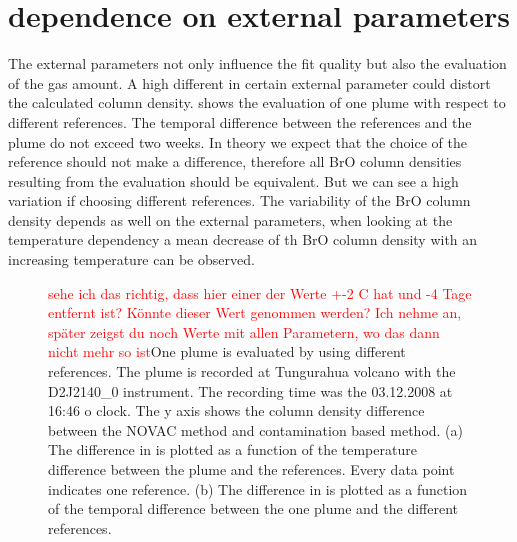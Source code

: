 \documentclass  [
  paper    = a4,
  BCOR     = 10mm,
  twoside,
  fontsize = 12pt,
  fleqn,
  toc      = bibnumbered,
  toc      = listofnumbered,
  numbers  = noendperiod,
  headings = normal,
  listof   = leveldown,
  version  = 3.03
]                                       {scrreprt}
\begin{document}
	\section{  dependence on external parameters\label{Chap:BrOdep}}
	The external parameters not only influence the fit quality but also the evaluation of the gas amount. A high different in certain external parameter could distort the calculated   column density.  shows the evaluation of one plume with respect to different references. The temporal difference between the references and the plume do not exceed two weeks. In theory we expect that the choice of  the reference should not make a difference, therefore all BrO column densities resulting from the evaluation should be equivalent. But we can see a high variation if choosing different references. The variability of the BrO column density depends as well on the external parameters, when looking at the temperature dependency a mean decrease of th BrO column density with an increasing temperature can be observed.
		\begin{figure}
		\caption{\textcolor{red}{sehe ich das richtig, dass hier einer der Werte +-2 C hat und -4 Tage entfernt ist? Könnte dieser Wert genommen werden? Ich nehme an, später zeigst du noch Werte mit allen Parametern, wo das dann nicht mehr so ist}One plume is evaluated by using different references. The plume is recorded at Tungurahua volcano with the D2J2140\_0 instrument. The recording time was the  03.12.2008  at 16:46 o clock. The y axis shows the   column density difference between the NOVAC method and contamination based method. (a) The difference in   is plotted as a function of the temperature difference between the plume and the references. Every data point indicates one reference. (b) The difference in   is plotted as a function of the temporal difference between the one plume and the different references.}
		\label{fig:d2j2140060218difftemperature-cbro}		
	\end{figure}
\end{document}
